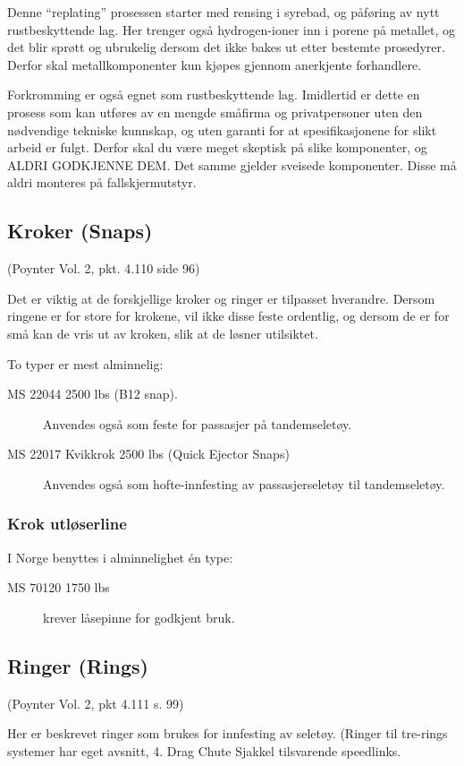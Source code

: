 Denne ``replating'' prosessen starter med rensing i syrebad, og påføring av nytt rustbeskyttende lag. Her trenger også hydrogen-ioner inn i porene på metallet, og det blir sprøtt og ubrukelig dersom det ikke bakes ut etter bestemte prosedyrer. Derfor skal metallkomponenter kun kjøpes gjennom anerkjente forhandlere.

Forkromming er også egnet som rustbeskyttende lag. Imidlertid er dette en prosess som kan utføres av en mengde småfirma og privatpersoner uten den nødvendige tekniske kunnskap, og uten garanti for at spesifikasjonene for slikt arbeid er fulgt. Derfor skal du være meget skeptisk på slike komponenter, og ALDRI GODKJENNE DEM. Det samme gjelder sveisede komponenter. Disse må aldri monteres på fallskjermutstyr.

\subsection{Kroker (Snaps)}
(Poynter Vol. 2, pkt. 4.110 side 96)

Det er viktig at de forskjellige kroker og ringer er tilpasset hverandre. Dersom ringene er for store for krokene, vil ikke disse feste ordentlig, og dersom de er for små kan de vris ut av kroken, slik at de løsner utilsiktet.

To typer er mest alminnelig:
\begin{description}
	\item[MS 22044 2500 lbs (B12 snap).] Anvendes også som feste for passasjer på tandemseletøy.
	\item[MS 22017 Kvikkrok 2500 lbs (Quick Ejector Snaps)] Anvendes også som hofte-innfesting av passasjerseletøy til tandemseletøy.
\end{description}

\subsubsection{Krok utløserline}
I Norge benyttes i alminnelighet én type:
\begin{description}
	\item[MS 70120 1750 lbs] krever låsepinne for godkjent bruk.
\end{description}

\subsection{Ringer (Rings)}
(Poynter Vol. 2, pkt 4.111 s. 99)

Her er beskrevet ringer som brukes for innfesting av seletøy. (Ringer til tre-rings systemer har eget avsnitt, 4. Drag Chute Sjakkel tilsvarende speedlinks.


